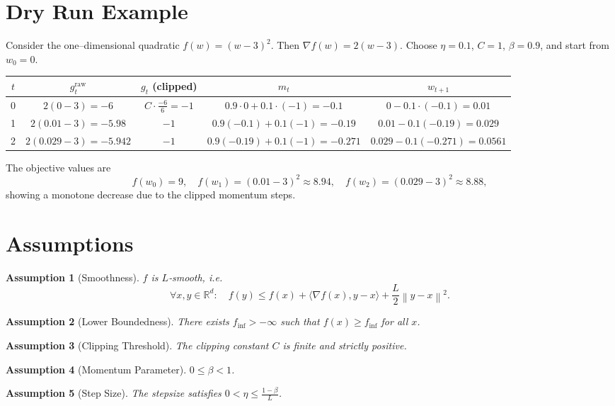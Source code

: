 \documentclass{article}
\newtheorem{assumption}{Assumption}
\newcommand{\norm}[1]{\left\lVert #1\right\rVert}
\newcommand{\grad}{\nabla}
\begin{document}
\section*{Dry Run Example}
Consider the one–dimensional quadratic $f(w)=(w-3)^2$.  
Then $\grad f(w)=2(w-3)$.  
Choose $\eta=0.1$, $C=1$, $\beta=0.9$, and start from $w_0=0$.

\begin{center}
\begin{tabular}{c|c|c|c|c}
$t$ & $g^{\text{raw}}_t$ & $g_t$ (clipped) & $m_t$ & $w_{t+1}$ \\ \hline
0 & $2(0-3)=-6$ & $C\cdot\frac{-6}{6}=-1$ & $0.9\cdot0+0.1\cdot(-1)=-0.1$ & $0-0.1\cdot(-0.1)=0.01$ \\[4pt]
1 & $2(0.01-3)=-5.98$ & $-1$ & $0.9(-0.1)+0.1(-1)=-0.19$ & $0.01-0.1(-0.19)=0.029$ \\[4pt]
2 & $2(0.029-3)=-5.942$ & $-1$ & $0.9(-0.19)+0.1(-1)=-0.271$ & $0.029-0.1(-0.271)=0.0561$ \\[4pt]
\end{tabular}
\end{center}

The objective values are
\[
f(w_0)=9,\quad f(w_1)=(0.01-3)^2\approx 8.94,\quad
f(w_2)=(0.029-3)^2\approx 8.88,
\]
showing a monotone decrease due to the clipped momentum steps.

\newpage

\section*{Assumptions}
\begin{assumption}[Smoothness]\label{ass:smooth}
$f$ is $L$‑smooth, i.e.
\[
\forall x,y\in\mathbb{R}^d:\quad
f(y)\le f(x)+\langle\grad f(x),y-x\rangle+\frac{L}{2}\norm{y-x}^2 .
\]
\end{assumption}
\begin{assumption}[Lower Boundedness]\label{ass:lb}
There exists $f_{\inf}>-\infty$ such that $f(x)\ge f_{\inf}$ for all $x$.
\end{assumption}
\begin{assumption}[Clipping Threshold]\label{ass:clip}
The clipping constant $C$ is finite and strictly positive.
\end{assumption}
\begin{assumption}[Momentum Parameter]\label{ass:beta}
$0\le\beta<1$.
\end{assumption}
\begin{assumption}[Step Size]\label{ass:stepsize}
The stepsize satisfies $0<\eta\le \frac{1-\beta}{L}$.
\end{assumption}
\end{document}
